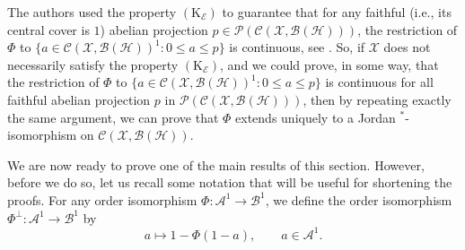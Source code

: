 \documentclass[12pt]{amsart}
\theoremstyle{definition}
\theoremstyle{remark}
\numberwithin{equation}{section}
\begin{document}
The authors  used the  property $\left(\mathrm{K}_{\mathcal{E}}\right)$ to guarantee that for any faithful (i.e., its central cover is $1$)  abelian projection $p \in \mathcal{P}\left(\mathcal{C}(\mathcal{X},\mathcal{B}(\mathcal{H}))\right)$, the restriction of $\Phi$ to $\{a \in \mathcal{C}(\mathcal{X},\mathcal{B}(\mathcal{H}))^1: 0 \leq a \leq p\}$ is continuous, see \cite[Section 4.1]{Our}. So, if $\mathcal{X}$ does not necessarily satisfy the property $\left(\mathrm{K}_{\mathcal{E}}\right)$, and we could prove, in some way, that the restriction of $\Phi$ to $\{a \in \mathcal{C}(\mathcal{X},\mathcal{B(H)})^1: 0 \leq a \leq p\}$ is continuous for all faithful  abelian projection $p$ in  $\mathcal{P}\left(\mathcal{C}(\mathcal{X},\mathcal{B}(\mathcal{H}))\right)$, then by repeating exactly the same argument, we can prove that $\Phi$ extends  uniquely to a  Jordan $^*$-isomorphism on $\mathcal{C}\left(\mathcal{X}, \mathcal{B}(\mathcal{H})\right)$.


We are now ready to prove one of the main results of this section. However, before we do so, let us recall some notation that will be useful for shortening the proofs. For any order isomorphism $\Phi: \mathcal{A}^1 \to \mathcal{B}^1$, we define the order isomorphism $\Phi^{\perp}: \mathcal{A}^1 \to \mathcal{B}^1$ by
$$a \mapsto 1 - \Phi(1-a), \qquad a\in \mathcal{A}^1.$$
\end{document}
